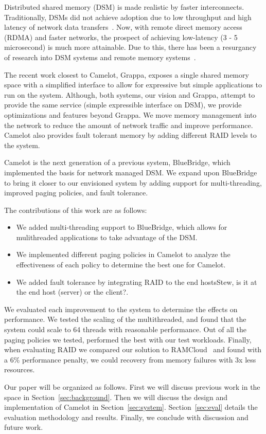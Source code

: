 Distributed shared memory (DSM) is made realistic by faster interconnects.
Traditionally, DSMs did not achieve adoption due to low throughput and high
latency of network data transfers~\cite{Li1989}. Now, with remote direct memory
access (RDMA) and faster networks, the prospect of achieving low-latency (3 - 5
microsecond) is much more attainable. Due to this, there has been a resurgancy
of research into DSM systems and remote memory systems~\cite{Ongaro2011,Nelson2015,Dragojevic2014}. 

The recent work closest to Camelot, Grappa, exposes a single shared memory
space with a simplified interface to allow for expressive but simple
applications to run on the system. Although, both systems, our vision and
Grappa, attempt to provide the same service (simple expressible interface on
DSM), we provide optimizations and features beyond Grappa. We move memory
management into the network to reduce the amount of network traffic and improve
performance. Camelot also provides fault tolerant memory by adding different
RAID levels to the system. 

Camelot is the next generation of a previous system, BlueBridge, which
implemented the basis for network managed DSM. We expand upon BlueBridge to
bring it closer to our envisioned system by adding support for multi-threading,
improved paging policies, and fault tolerance.

The contributions of this work are as follows:
\begin{itemize}
	\item We added multi-threading support to BlueBridge, which allows for
	mulithreaded applications to take advantage of the DSM.
	\item We implemented different paging policies in Camelot to analyze the
	effectiveness of each policy to determine the best one for Camelot.
	\item We added fault tolerance by integrating RAID to the end hosts\ac{Stew,
	is it at the end host (server) or the client?}.
\end{itemize}

We evaluated each improvement to the system to determine the effects on
performance. We tested the scaling of the multithreaded, and found that the
system could scale to 64 threads with reasonable performance. Out of all the
paging policies we tested,  performed the best
with our test workloads. Finally, when evaluating RAID we compared our solution
to RAMCloud~\cite{Ongaro2011} and found with a 6\% performance penalty, we could
recovery from memory failures with 3x less resources. 

Our paper will be organized as follows. First we will discuss previous work in
the space in Section~\ref{sec:background}. Then we will discuss the design and
implementation of Camelot in Section~\ref{sec:system}. Section~\ref{sec:eval}
details the evaluation methodology and results. Finally, we conclude with
discussion and future work. 

